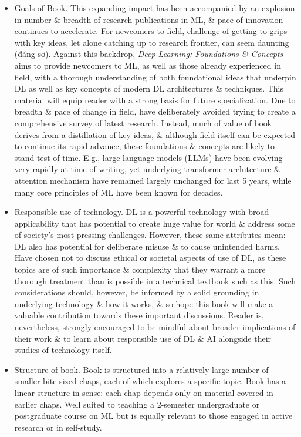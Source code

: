 \documentclass{article}
\begin{document}
\begin{itemize}
	\item {\sf Goals of Book.} This expanding impact has been accompanied by an explosion in number \& breadth of research publications in ML, \& pace of innovation continues to accelerate. For newcomers to field, challenge of getting to grips with key ideas, let alone catching up to research frontier, can seem daunting (đáng sợ). Against this backdrop, {\it Deep Learning: Foundations \& Concepts} aims to provide newcomers to ML, as well as those already experienced in field, with a thorough understanding of both foundational ideas that underpin DL as well as key concepts of modern DL architectures \& techniques. This material will equip reader with a strong basis for future specialization. Due to breadth \& pace of change in field, have deliberately avoided trying to create a comprehensive survey of latest research. Instead, much of value of book derives from a distillation of key ideas, \& although field itself can be expected to continue its rapid advance, these foundations \& concepts are likely to stand test of time. E.g., large language models (LLMs) have been evolving very rapidly at time of writing, yet underlying transformer architecture \& attention mechanism have remained largely unchanged for last 5 years, while many core principles of ML have been known for decades.
	\item {\sf Responsible use of technology.} DL is a powerful technology with broad applicability that has potential to create huge value for world \& address some of society's most pressing challenges. However, these same attributes mean: DL also has potential for deliberate misuse \& to cause unintended harms. Have chosen not to discuss ethical or societal aspects of use of DL, as these topics are of such importance \& complexity that they warrant a more thorough treatment than is possible in a technical textbook such as this. Such considerations should, however, be informed by a solid grounding in underlying technology \& how it works, \& so hope this book will make a valuable contribution towards these important discussions. Reader is, nevertheless, strongly encouraged to be mindful about broader implications of their work \& to learn about responsible use of DL \& AI alongside their studies of technology itself.
	\item {\sf Structure of book.} Book is structured into a relatively large number of smaller bite-sized chaps, each of which explores a specific topic. Book has a linear structure in sense: each chap depends only on material covered in earlier chaps. Well suited to teaching a 2-semester undergraduate or postgraduate course on ML but is equally relevant to those engaged in active research or in self-study.
	

\end{itemize}
\end{document}
